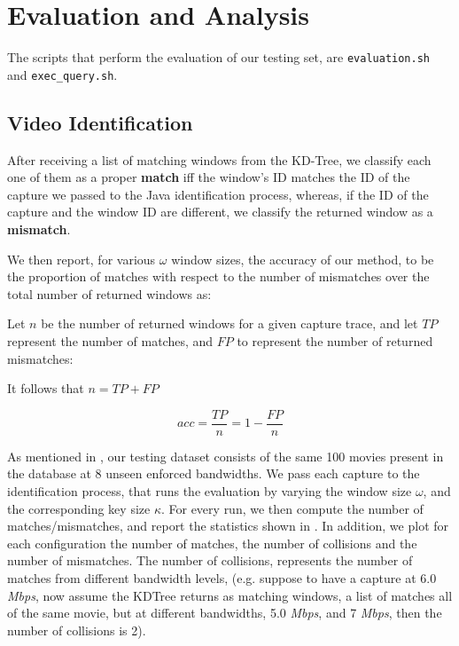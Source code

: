 \chapter{Evaluation and Analysis}\label{sec:results}

The scripts that perform the evaluation of our testing set, are \texttt{evaluation.sh} and \texttt{exec\_query.sh}.

\section{Video Identification}
After receiving a list of matching windows from the KD-Tree, we classify each one of them as a proper \textbf{match} iff the window's ID matches the ID of the capture we passed to the Java identification process, whereas, if the ID of the capture and the window ID are different, we classify the returned window as a \textbf{mismatch}.

We then report, for various $\omega$ window sizes, the accuracy of our method, to be the proportion of matches with respect to the number of mismatches over the total number of returned windows as:

Let $n$ be the number of returned windows for a given capture trace, and let $TP$ represent the number of matches, and $FP$ to represent the number of returned mismatches:

It follows that $n = TP + FP$

\begin{equation*}
    acc = \dfrac{TP}{n} = 1 - \dfrac{FP}{n}
\end{equation*}

As mentioned in , our testing dataset consists of the same 100 movies present in the database at 8 unseen enforced bandwidths. We pass each capture to the identification process, that runs the evaluation by varying the window size $\omega$, and the corresponding key size $\kappa$. For every run, we then compute the number of matches/mismatches, and report the statistics shown in . In addition, we plot for each configuration the number of matches, the number of collisions and the number of mismatches. The number of collisions, represents the number of matches from different bandwidth levels, (e.g. suppose to have a capture at 6.0 \emph{Mbps}, now assume the KDTree returns as matching windows, a list of matches all of the same movie, but at different bandwidths, 5.0 \emph{Mbps}, and 7 \emph{Mbps}, then the number of collisions is 2).

